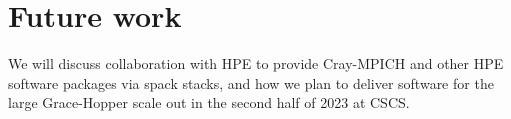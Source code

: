 \section{Future work}

We will discuss collaboration with HPE to provide Cray-MPICH and other HPE software packages via spack stacks, and how we plan to deliver software for the large Grace-Hopper scale out in the second half of 2023 at CSCS.

